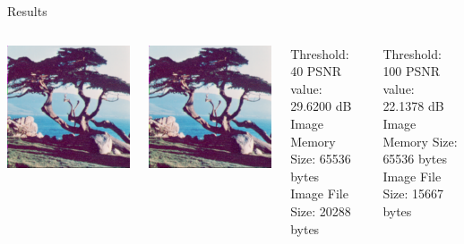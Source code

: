\documentclass{beamer}
\begin{document}
\begin{frame}{Results}

	\begin{columns}[T,onlytextwidth]
	
		
		\centering
		\includegraphics[page=3, width=.7\columnwidth]{image/images}
	
		\includegraphics[page=5, width=.7\columnwidth]{image/images}
	
	
		\begin{MyBox}{Threshold: 40}
			\footnotesize{
			PSNR value: 29.6200 dB \\
			Image Memory Size: 65536 bytes \\
			Image File Size: 20288 bytes
			}
		\end{MyBox}
		
		\medskip \medskip \medskip \medskip \medskip \medskip 

		\begin{MyBox}{Threshold: 100}
			\footnotesize{
			PSNR value: 22.1378 dB \\
			Image Memory Size: 65536 bytes \\
			Image File Size: 15667 bytes
			}
		\end{MyBox}


	\end{columns}
			
	\end{frame}
\end{document}
